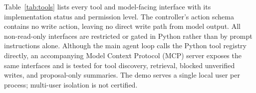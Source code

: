 Table~\ref{tab:tools} lists every tool and model-facing interface with its implementation status and permission level. The controller's action schema contains no write action, leaving no direct write path from model output. All non-read-only interfaces are restricted or gated in Python rather than by prompt instructions alone. Although the main agent loop calls the Python tool registry directly, an accompanying Model Context Protocol (MCP) server exposes the same interfaces and is tested for tool discovery, retrieval, blocked unverified writes, and proposal-only summaries. The demo serves a single local user per process; multi-user isolation is not certified.

